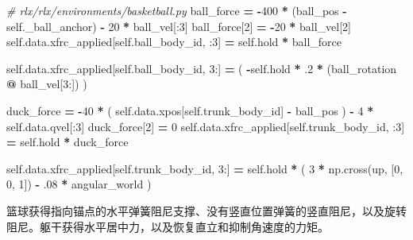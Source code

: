 \documentclass[
  chinese,
  11pt,
  letterpaper,
]{article}
\newenvironment{Shaded}{\begin{snugshade}}{\end{snugshade}}
\newcommand{\CommentTok}[1]{\textcolor[rgb]{0.56,0.35,0.01}{\textit{#1}}}
\newcommand{\DecValTok}[1]{\textcolor[rgb]{0.00,0.00,0.81}{#1}}
\newcommand{\FloatTok}[1]{\textcolor[rgb]{0.00,0.00,0.81}{#1}}
\newcommand{\NormalTok}[1]{#1}
\newcommand{\OperatorTok}[1]{\textcolor[rgb]{0.81,0.36,0.00}{\textbf{#1}}}
\newcommand{\VariableTok}[1]{\textcolor[rgb]{0.00,0.00,0.00}{#1}}
\renewenvironment{Shaded}{\par\smallskip}{\par\smallskip}
\begin{document}
\begin{Shaded}
\begin{Highlighting}[]
\CommentTok{\# rlx/rlx/environments/basketball.py}
\NormalTok{ball\_force }\OperatorTok{=} \OperatorTok{{-}}\DecValTok{400} \OperatorTok{*}\NormalTok{ (ball\_pos }\OperatorTok{{-}} \VariableTok{self}\NormalTok{.\_ball\_anchor) }\OperatorTok{{-}} \DecValTok{20} \OperatorTok{*}\NormalTok{ ball\_vel[:}\DecValTok{3}\NormalTok{]}
\NormalTok{ball\_force[}\DecValTok{2}\NormalTok{] }\OperatorTok{=} \OperatorTok{{-}}\DecValTok{20} \OperatorTok{*}\NormalTok{ ball\_vel[}\DecValTok{2}\NormalTok{]}
\VariableTok{self}\NormalTok{.data.xfrc\_applied[}\VariableTok{self}\NormalTok{.ball\_body\_id, :}\DecValTok{3}\NormalTok{] }\OperatorTok{=} \VariableTok{self}\NormalTok{.hold }\OperatorTok{*}\NormalTok{ ball\_force}

\VariableTok{self}\NormalTok{.data.xfrc\_applied[}\VariableTok{self}\NormalTok{.ball\_body\_id, }\DecValTok{3}\NormalTok{:] }\OperatorTok{=}\NormalTok{ (}
    \OperatorTok{{-}}\VariableTok{self}\NormalTok{.hold }\OperatorTok{*} \FloatTok{.2} \OperatorTok{*}\NormalTok{ (ball\_rotation }\OperatorTok{@}\NormalTok{ ball\_vel[}\DecValTok{3}\NormalTok{:])}
\NormalTok{)}

\NormalTok{duck\_force }\OperatorTok{=} \OperatorTok{{-}}\DecValTok{40} \OperatorTok{*}\NormalTok{ (}
    \VariableTok{self}\NormalTok{.data.xpos[}\VariableTok{self}\NormalTok{.trunk\_body\_id] }\OperatorTok{{-}}\NormalTok{ ball\_pos}
\NormalTok{) }\OperatorTok{{-}} \DecValTok{4} \OperatorTok{*} \VariableTok{self}\NormalTok{.data.qvel[:}\DecValTok{3}\NormalTok{]}
\NormalTok{duck\_force[}\DecValTok{2}\NormalTok{] }\OperatorTok{=} \DecValTok{0}
\VariableTok{self}\NormalTok{.data.xfrc\_applied[}\VariableTok{self}\NormalTok{.trunk\_body\_id, :}\DecValTok{3}\NormalTok{] }\OperatorTok{=} \VariableTok{self}\NormalTok{.hold }\OperatorTok{*}\NormalTok{ duck\_force}

\VariableTok{self}\NormalTok{.data.xfrc\_applied[}\VariableTok{self}\NormalTok{.trunk\_body\_id, }\DecValTok{3}\NormalTok{:] }\OperatorTok{=} \VariableTok{self}\NormalTok{.hold }\OperatorTok{*}\NormalTok{ (}
    \DecValTok{3} \OperatorTok{*}\NormalTok{ np.cross(up, [}\DecValTok{0}\NormalTok{, }\DecValTok{0}\NormalTok{, }\DecValTok{1}\NormalTok{]) }\OperatorTok{{-}} \FloatTok{.08} \OperatorTok{*}\NormalTok{ angular\_world}
\NormalTok{)}
\end{Highlighting}
\end{Shaded}

篮球获得指向锚点的水平弹簧阻尼支撑、没有竖直位置弹簧的竖直阻尼，以及旋转阻尼。躯干获得水平居中力，以及恢复直立和抑制角速度的力矩。
\end{document}
